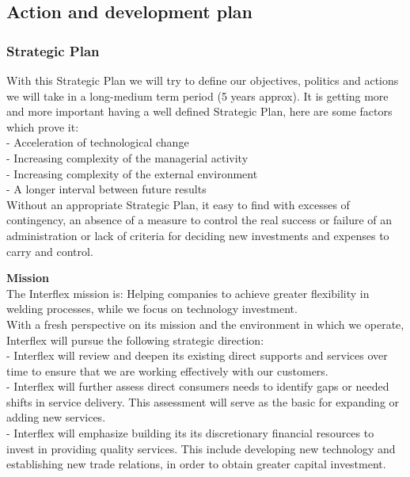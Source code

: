 \subsection{Action and development plan}
\subsubsection{Strategic Plan}
With this Strategic Plan we will try to define our objectives, politics and actions we will take in a long-medium term period (5 years approx). It is getting more and more important having a well defined Strategic Plan, here are some factors which prove it:\\
	- Acceleration of technological change\\
	- Increasing complexity of the managerial activity\\
	- Increasing complexity of the external environment\\
	- A longer interval between future results\\
Without an appropriate Strategic Plan, it easy to find with excesses of contingency, an absence of a measure to control the real success or failure of an administration or lack of criteria for deciding new investments and expenses to carry and control.

\textbf{Mission}\\
The Interflex mission is:
Helping companies to achieve greater flexibility in welding processes, while we focus on technology investment.\\

With a fresh perspective on its mission and the environment in which we operate, Interflex will pursue the following strategic direction:\\
	- Interflex will review and deepen its existing direct supports and services over time to ensure that we are working effectively with our customers.\\
	- Interflex will further assess direct consumers needs to identify gaps or needed shifts in service delivery. This assessment will serve as the basic for expanding or adding new services.\\
	- Interflex will emphasize building its its discretionary financial resources to invest in providing quality services. This include developing new technology and establishing new trade relations, in order to obtain greater capital investment.

